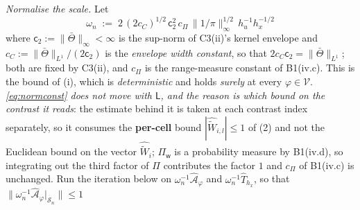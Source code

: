 \begin{definition}
\emph{Normalise the scale.} Let
\begin{equation}\label{eq:normconst}
\omega_n\;:=\;2\,(2c_C)^{1/2}\,\mathsf c_2^{2}\,c_\Pi\,\|1/\pi\|_\infty^{1/2}\,h_u^{-1}h_x^{-1/2}
\end{equation}
where $\mathsf c_2:=\|\bar\Theta\|_\infty<\infty$ is the sup-norm of C3(ii)'s kernel envelope and
$c_C:=\|\bar\Theta\|_{L^{1}}/(2\mathsf c_2)$ is the \emph{envelope width constant}, so that
$2c_C\mathsf c_2=\|\bar\Theta\|_{L^{1}}$; both are fixed by C3(ii), and $c_\Pi$ is the range-measure
constant of B1(iv.c).
This is
the bound of (i), which is \emph{deterministic} and holds \emph{surely} at every
$\varphi\in\mathcal V$. \emph{\eqref{eq:normconst} does not move with $\mathsf L$, and the reason is which
bound on the contrast it reads}: the estimate behind it is taken at each contrast index separately, so it
consumes the \textbf{per-cell} bound $|\widehat{\widetilde W}_{i,l}|\le1$ of
\textup{(2)} and not the Euclidean bound on the vector $\widehat{\widetilde W}_i$;
$\Pi_{\mathsf w}$ is a probability measure by B1(iv.d), so integrating out the third factor of $\Pi$
contributes the factor $1$ and $c_\Pi$ of B1(iv.c) is unchanged.
Run the iteration below on $\omega_n^{-1}\hat{\mathcal A}_\varphi$ and
$\omega_n^{-1}\hat T_{h_x}$, so that $\|\omega_n^{-1}\hat{\mathcal A}_\varphi\vert_{\mathcal S_n}\|\le1$

\end{definition}
